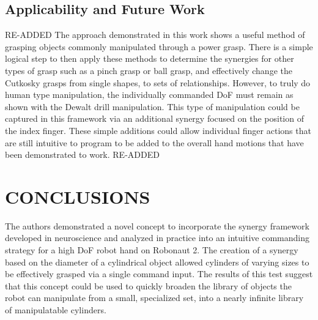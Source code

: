 \documentclass[runningheads,a4paper]{llncs}
\begin{document}


\subsection{Applicability and Future Work}
RE-ADDED
The approach demonstrated in this work shows a useful method of grasping objects commonly manipulated through a power grasp. There is a simple logical step to then apply these methods to determine the synergies for other types of grasp such as a pinch grasp or ball grasp, and effectively change the Cutkosky grasps from single shapes, to sets of relationships. However, to truly do human type manipulation, the individually commanded DoF must remain as shown with the Dewalt drill manipulation. This type of manipulation could be captured in this framework via an additional synergy focused on the position of the index finger. These simple additions could allow individual finger actions that are still intuitive to program to be added to the overall hand motions that have been demonstrated to work. 
RE-ADDED
 
\section{CONCLUSIONS}

The authors demonstrated a novel concept to incorporate the synergy framework developed in neuroscience and analyzed in practice  into an intuitive commanding strategy for a high DoF robot hand on Robonaut 2. The creation of a synergy based on the diameter of a cylindrical object allowed cylinders of varying sizes to be effectively grasped via a single command input. The results of this test suggest that this concept could be used to quickly broaden the library of objects the robot can manipulate from a small, specialized set, into a nearly infinite library of manipulatable cylinders. 




\end{document}
